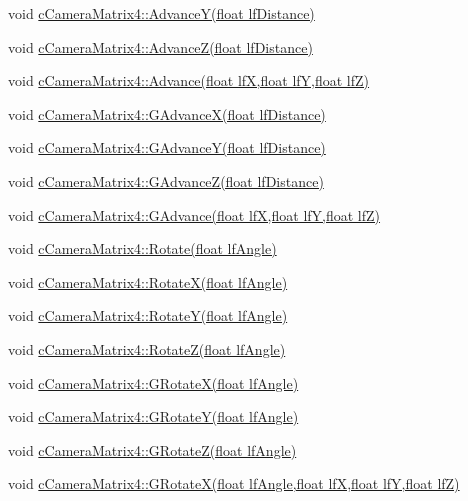  void \hyperlink{classc_camera_matrix4_a1c644144c6673fad0d45ac2a28065edb}{cCameraMatrix4::AdvanceY(float lfDistance)} \par
 void \hyperlink{classc_camera_matrix4_a18915056c461b31b5ea916715fa2582f}{cCameraMatrix4::AdvanceZ(float lfDistance)} \par
 void \hyperlink{classc_camera_matrix4_acd0e691c270f18c80965bf8da4442d5b}{cCameraMatrix4::Advance(float lfX,float lfY,float lfZ)} \par
 \par
 void \hyperlink{classc_camera_matrix4_a69ef5c53bd239d2f1041ac9330c2cc08}{cCameraMatrix4::GAdvanceX(float lfDistance)} \par
 void \hyperlink{classc_camera_matrix4_a7cb5d64085acdcc74dcad1e965a52b3b}{cCameraMatrix4::GAdvanceY(float lfDistance)} \par
 void \hyperlink{classc_camera_matrix4_afd68814e78dd2ffaec2f9bc4289aca36}{cCameraMatrix4::GAdvanceZ(float lfDistance)} \par
 void \hyperlink{classc_camera_matrix4_a342b888f43a65b6c4a14b818c2519157}{cCameraMatrix4::GAdvance(float lfX,float lfY,float lfZ)} \par
 \par
 void \hyperlink{classc_camera_matrix4_a1de293dc89d68f1688098dc82a1c2655}{cCameraMatrix4::Rotate(float lfAngle)} \par
 void \hyperlink{classc_camera_matrix4_abb8a5e1d961915829f3200b74319af61}{cCameraMatrix4::RotateX(float lfAngle)} \par
 void \hyperlink{classc_camera_matrix4_a86e20cd48f8a5427d98361d9b838273d}{cCameraMatrix4::RotateY(float lfAngle)} \par
 void \hyperlink{classc_camera_matrix4_ab0d7c6b5cdc0b9581633736404a3b843}{cCameraMatrix4::RotateZ(float lfAngle)} \par
 \par
 void \hyperlink{classc_camera_matrix4_a09c8d44629bf63643c8f09ccdc2294bc}{cCameraMatrix4::GRotateX(float lfAngle)} \par
 void \hyperlink{classc_camera_matrix4_a48eb5374c0e7fa4eca25f48a6411052d}{cCameraMatrix4::GRotateY(float lfAngle)} \par
 void \hyperlink{classc_camera_matrix4_a993d7410719b1fd7d871f728527a3947}{cCameraMatrix4::GRotateZ(float lfAngle)} \par
 \par
 void \hyperlink{classc_camera_matrix4_a2fc16f6a7aa3ffec1317f71645aa857b}{cCameraMatrix4::GRotateX(float lfAngle,float lfX,float lfY,float lfZ)} \par
